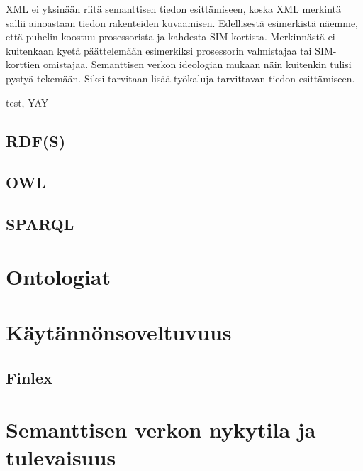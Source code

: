 \documentclass[finnish, 12pt, a4paper, elec, utf8, pdfa, online]{aaltothesis}
\begin{document}
XML ei yksinään riitä semanttisen tiedon esittämiseen, koska XML merkintä sallii ainoastaan tiedon rakenteiden kuvaamisen. Edellisestä esimerkistä näemme, että puhelin koostuu prosessorista ja kahdesta SIM-kortista. Merkinnästä ei kuitenkaan kyetä päättelemään esimerkiksi prosessorin valmistajaa tai SIM-korttien omistajaa. Semanttisen verkon ideologian mukaan näin kuitenkin tulisi pystyä tekemään. Siksi tarvitaan lisää työkaluja tarvittavan tiedon esittämiseen.


test, YAY

\subsection{RDF(S)}

\subsection{OWL}

\subsection{SPARQL}

\clearpage
\section{Ontologiat}



\clearpage
\section{Käytännönsoveltuvuus}

\subsection{Finlex}

\clearpage
\section{Semanttisen verkon nykytila ja tulevaisuus}
\end{document}
